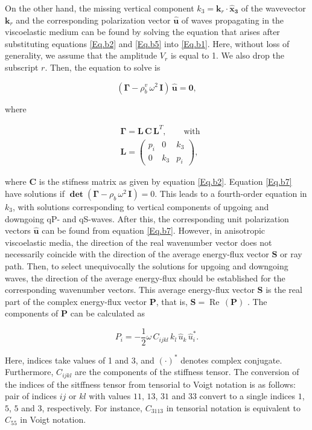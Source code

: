 \documentclass[draft]{agujournal2019}
\renewcommand{\Re}{\operatorname{Re} }
\begin{document}
On the other hand,  the missing vertical component  $k_3=\bm{k}_r\cdot \bm{\hat{x}_3}$ of the wavevector $\bm{k}_r$ and the corresponding polarization vector $\bm{\hat{u}}$ of waves propagating in the viscoelastic medium can be found by solving the equation that arises after substituting equations \eqref{Eq.b2} and \eqref{Eq.b5} into \eqref{Eq.b1}. Here, without loss of generality, we assume that the amplitude $V_r$ is equal to 1. We also drop the subscript $r$. Then, the equation to solve is
\begin{linenomath*}
\begin{equation}\label{Eq.b7}
(\bm{\Gamma} - \rho_b^v \, \omega^2 \,\bm{I}) \,\bm{\hat{u}} = \bm{0},
\end{equation}
\end{linenomath*}
where
\begin{linenomath*}
\begin{equation}\label{Eq.b8}
\begin{split}
&\bm{\Gamma}=\bm{L}\,\bm{C}\,\bm{L}^T, \qquad  \text{with}  \\
&\bm{L}=\begin{pmatrix}  p_i & 0 & k_3\\ 0 & k_3 & p_i \end{pmatrix},
\end{split}
\end{equation}
\end{linenomath*}
where $\bm{C}$ is the stifness matrix as given by equation \eqref{Eq.b2}. Equation \eqref{Eq.b7} have solutions if $\bm{\det}(\bm{\Gamma} - \rho_b \, \omega^2 \,\bm{I}) = 0 $. This leads to a fourth-order equation in $k_3$, with solutions corresponding to vertical components of upgoing and downgoing qP- and qS-waves. After this, the corresponding unit polarization vectors $\bm{\hat{u}}$ can be found from equation \eqref{Eq.b7}. However, in anisotropic viscoelastic media, the direction of the real wavenumber vector  does not necessarily coincide with the direction of the average energy-flux vector $\bm{S}$ or ray path. Then, to select unequivocally the solutions for upgoing and downgoing waves, the  direction of the average energy-flux should be established for the corresponding wavenumber vectors. This average energy-flux vector $\bm{S}$ is the real part of the complex energy-flux vector $\bm{P}$, that is, $\bm{S} = \Re\,(\bm{P})$ \cite{Carcione1993, Cerveny2006}. The components of $\bm{P}$  can be calculated as \cite{carcione2007wave}
\begin{linenomath*}
\begin{equation}\label{Eq.b9}
P_i = -\frac{1}{2} \omega \, C_{ijkl}\, k_l\,\hat{u}_k \,\hat{u}_i^*.
\end{equation}
\end{linenomath*}
Here, indices take values of 1 and 3, and $\left(\cdot\right)^*$ denotes complex conjugate.
Furthermore, $C_{ijkl}$ are the components of the stiffness tensor. The conversion of the indices of the sitffness tensor from tensorial to  Voigt notation is as follows:  pair of indices  $ij$ or $kl$ with values $11$, $13$, $31$ and $33$ convert to a single indices $1$, $5$, $5$ and $3$, respectively. For instance, $C_{3113}$ in tensorial notation is equivalent to $C_{55}$ in Voigt notation.
\end{document}
